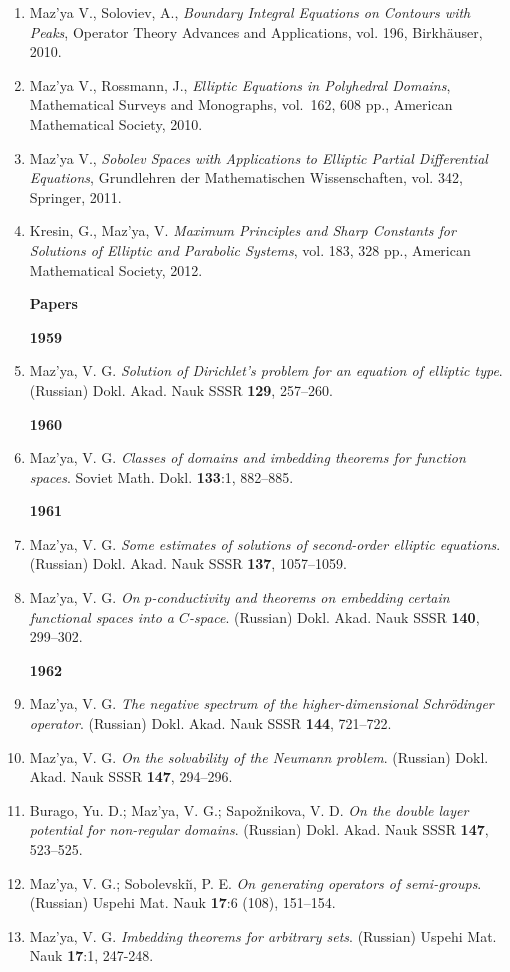 \documentclass{article}
\begin{document}
\begin{enumerate}
\item Maz'ya V.,  Soloviev, A., {\it Boundary Integral Equations on Contours with Peaks}, Operator Theory Advances and Applications, vol. 196, Birkh\"auser, 2010.

\item Maz'ya V., Rossmann, J., {\it Elliptic Equations in Polyhedral Domains},      Mathematical Surveys and
       Monographs, vol.~162, 608 pp., American Mathematical Society,
2010.

\item Maz'ya V., {\it Sobolev Spaces with Applications to Elliptic Partial Differential Equations}, Grundlehren der Mathematischen Wissenschaften, vol. 342, Springer, 2011.

\item Kresin, G., Maz'ya, V. {\it Maximum Principles and Sharp Constants for Solutions of Elliptic and Parabolic Systems}, vol. 183, 328 pp., American Mathematical Society,
2012.

\vfill\eject
\textbf{\Large Papers}

\vspace{1em}
{\bf 1959}
\item Maz'ya, V. G. {\it Solution of Dirichlet's problem for an
equation
of elliptic type}. (Russian) Dokl. Akad.
Nauk SSSR {\bf 129}, 257--260.\hfill\break

{\bf 1960}
\item Maz'ya, V. G. {\it Classes of domains and imbedding theorems for
function spaces}. Soviet Math. Dokl. {\bf 133}:1,
882--885.\hfill\break

{\bf 1961}
\item Maz'ya, V. G. {\it Some estimates of solutions of second-order
elliptic equations}. (Russian) Dokl. Akad. Nauk
SSSR {\bf 137}, 1057--1059.
\item Maz'ya, V. G. {\it On $p$-conductivity and theorems on embedding
certain functional spaces into a $C$-space}.
(Russian) Dokl. Akad. Nauk SSSR {\bf 140}, 299--302.\hfill\break

{\bf 1962}
\item Maz'ya, V. G. {\it The negative spectrum of the
higher-dimensional
Schr\"odinger operator}. (Russian) Dokl. Akad. Nauk
SSSR {\bf 144}, 721--722.
\item Maz'ya, V. G. {\it On the solvability of the Neumann problem}.
(Russian) Dokl. Akad. Nauk SSSR {\bf 147},
294--296.
\item Burago, Yu. D.; Maz'ya, V. G.; Sapo\v znikova, V. D. {\it On the
double layer potential  for non-regular
domains}. (Russian) Dokl. Akad. Nauk SSSR {\bf 147}, 523--525.
\item Maz'ya, V. G.; Sobolevski{\u\i}, P. E. {\it On generating
operators
of semi-groups}. (Russian) Uspehi Mat.
Nauk {\bf 17}:6 (108), 151--154.
\item Maz'ya, V. G. {\it Imbedding theorems for arbitrary sets}.
(Russian)
Uspehi Mat. Nauk {\bf 17}:1, 247-248.\hfill\break


\end{enumerate}
\end{document}
